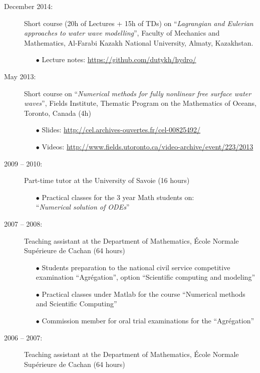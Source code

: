 \begin{description}
        \item[December 2014:] Short course (20h of Lectures + 15h of TDs) on ``\textit{Lagrangian and Eulerian approaches to water wave modelling}'', Faculty of Mechanics and Mathematics, Al-Farabi Kazakh National University, Almaty, Kazakhstan.
        \begin{itemize}
            \item[$\bullet$] Lecture notes: \url{https://github.com/dutykh/hydro/}
        \end{itemize}
        \item[May 2013:] Short course on ``\textit{Numerical methods for fully nonlinear free surface water waves}'', Fields Institute, Thematic Program on the Mathematics of Oceans, Toronto, Canada (4h)
        \begin{itemize}
            \item[$\bullet$] Slides: \url{http://cel.archives-ouvertes.fr/cel-00825492/}
            \item[$\bullet$] Videos: \url{http://www.fields.utoronto.ca/video-archive/event/223/2013}
        \end{itemize}
        \item[2009 -- 2010:] Part-time tutor at the University of Savoie (16 hours)
        \begin{itemize}
            \item[$\bullet$] Practical classes for the 3 year Math students on: \\
                ``\textit{Numerical solution of ODEs}''
        \end{itemize}
        \item[2007 -- 2008:] Teaching assistant at the Department of Mathematics, \'Ecole Normale Sup\'erieure de Cachan (64 hours)
        \begin{itemize}
            \item[$\bullet$] Students preparation to the national civil service competitive examination ``Agr\'egation'', option ``Scientific computing and modeling''
            \item[$\bullet$] Practical classes under Matlab for the course ``Numerical methods and Scientific Computing''
            \item[$\bullet$] Commission member for oral trial examinations for the ``Agr\'egation''
        \end{itemize}
        \item[2006 -- 2007:] Teaching assistant at the Department of Mathematics, \'Ecole Normale Sup\'erieure de Cachan (64 hours)

\end{description}
